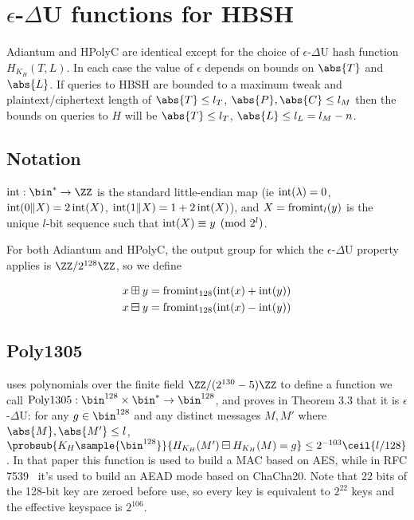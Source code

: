 \documentclass[eprint.tex]{subfiles}
\begin{document}
\section{\texorpdfstring{$\epsilon$-$\Delta$U}{𝜖-∆U} functions for HBSH}\label{hashing}

Adiantum and HPolyC are identical except for the choice of $\epsilon$-$\Delta$U hash function
$H_{K_H}(T, L)$. In each case the value of $\epsilon$ depends on bounds on $\abs{T}$ and $\abs{L}$.
If queries to HBSH are bounded to a maximum tweak and plaintext/ciphertext length of
$\abs{T} \leq l_T$, $\abs{P}, \abs{C} \leq l_M$
then the bounds on queries to $H$ will be $\abs{T} \leq l_T$, $\abs{L} \leq l_L = l_M - n$.

\subsection{Notation}

$\intify: \bin^{*} \rightarrow \ZZ$ is the
standard little-endian map
(ie $\operatorname{int}(\lambda) = 0$, $\operatorname{int}(0 \Vert X) = 2\operatorname{int}(X)$, $\operatorname{int}(1 \Vert X) = 1 + 2\operatorname{int}(X)$),
and $X = \operatorname{fromint}_l(y)$ is the unique
$l$-bit sequence such that $\operatorname{int}(X) \equiv y \pmod{2^l}$.

For both Adiantum and HPolyC,
the output group for which the $\epsilon$-$\Delta$U property applies is
$\ZZ/2^{128}\ZZ$, so we define

\begin{align*}
    x \boxplus y &= \operatorname{fromint}_{128}(\operatorname{int}(x) + \operatorname{int}(y)) \\
    x \boxminus y &= \operatorname{fromint}_{128}(\operatorname{int}(x) - \operatorname{int}(y)) \\
\end{align*}

\subsection{Poly1305}

\cite{poly1305} uses polynomials over the finite field $\ZZ/(2^{130}-5)\ZZ$
to define a function we call
$\Polydjb: \bin^{128} \times \bin^* \rightarrow \bin^{128}$,
and proves in Theorem 3.3 that it is $\epsilon$-$\Delta$U: for any
$g \in \bin^{128}$ and any distinct messages $M, M'$ where $\abs{M}, \abs{M'} \leq l$,
$\probsub{K_H \sample{\bin^{128}}}{H_{K_H}(M') \boxminus H_{K_H}(M) = g} \leq 2^{-103}\ceil{l/128}$.
In that paper this function is used to build a MAC based on AES, while in
RFC 7539~\cite{RFC7539} it's used to build an AEAD mode based on ChaCha20.
Note that 22 bits of the 128-bit key are zeroed before use, so every key is equivalent to
$2^{22}$ keys and the effective keyspace is $2^{106}$.
\end{document}
